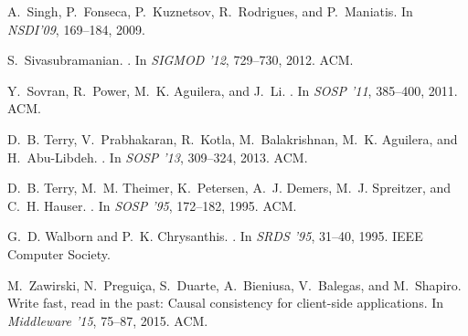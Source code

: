 \documentclass[11pt,dvipdfm]{article}
\begin{document}
\begin{thebibliography}{10}
\begin{small}
A.~Singh, P.~Fonseca, P.~Kuznetsov, R.~Rodrigues, and P.~Maniatis.
\newblock In {\em NSDI'09}, 169--184, 2009.

S.~Sivasubramanian.
.
\newblock In {\em SIGMOD '12}, 729--730, 2012. ACM.

Y.~Sovran, R.~Power, M.~K. Aguilera, and J.~Li.
.
\newblock In {\em SOSP  '11}, 385--400, 2011. ACM.
  

D.~B. Terry, V.~Prabhakaran, R.~Kotla, M.~Balakrishnan, M.~K. Aguilera, and
  H.~Abu-Libdeh.
.
\newblock In {\em SOSP '13}, 309--324, 2013. ACM.

D.~B. Terry, M.~M. Theimer, K.~Petersen, A.~J. Demers, M.~J. Spreitzer, and
  C.~H. Hauser.
.
\newblock In {\em SOSP  '95}, 172--182, 1995. ACM.

G.~D. Walborn and P.~K. Chrysanthis.
.
\newblock In {\em SRDS '95}, 31--40, 1995. IEEE Computer Society.
  

M.~Zawirski, N.~Pregui\c{c}a, S.~Duarte, A.~Bieniusa, V.~Balegas, and
  M.~Shapiro.
\newblock Write fast, read in the past: Causal consistency for client-side
  applications.
\newblock In {\em Middleware '15}, 75--87, 2015. ACM.
  


\end{small}
\end{thebibliography}
\end{document}

